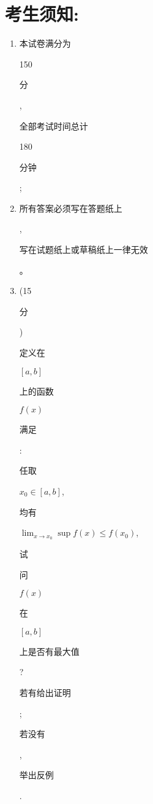 \documentclass[10pt]{article}
\begin{document}
\section{考生须知:}
\begin{enumerate}
  \item \begin{CJK}{UTF8}{mj}本试卷满分为\end{CJK} 150 \begin{CJK}{UTF8}{mj}分\end{CJK}, \begin{CJK}{UTF8}{mj}全部考试时间总计\end{CJK} 180 \begin{CJK}{UTF8}{mj}分钟\end{CJK};

  \item \begin{CJK}{UTF8}{mj}所有答案必须写在答题纸上\end{CJK}, \begin{CJK}{UTF8}{mj}写在试题纸上或草稿纸上一律无效\end{CJK}。

  \item (15 \begin{CJK}{UTF8}{mj}分\end{CJK}) \begin{CJK}{UTF8}{mj}定义在\end{CJK} $[a, b]$ \begin{CJK}{UTF8}{mj}上的函数\end{CJK} $f(x)$ \begin{CJK}{UTF8}{mj}满足\end{CJK}: \begin{CJK}{UTF8}{mj}任取\end{CJK} $x_{0} \in[a, b]$, \begin{CJK}{UTF8}{mj}均有\end{CJK} $\lim _{x \rightarrow x_{0}} \sup f(x) \leq f\left(x_{0}\right)$, \begin{CJK}{UTF8}{mj}试\end{CJK} \begin{CJK}{UTF8}{mj}问\end{CJK} $f(x)$ \begin{CJK}{UTF8}{mj}在\end{CJK} $[a, b]$ \begin{CJK}{UTF8}{mj}上是否有最大值\end{CJK}? \begin{CJK}{UTF8}{mj}若有给出证明\end{CJK}; \begin{CJK}{UTF8}{mj}若没有\end{CJK}, \begin{CJK}{UTF8}{mj}举出反例\end{CJK}.


\end{enumerate}
\end{document}
